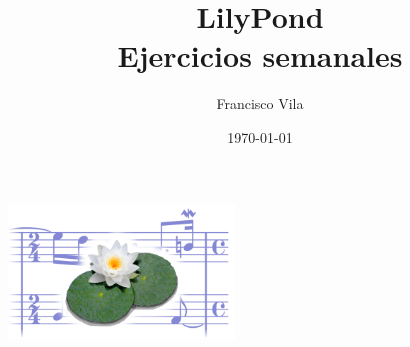 \documentclass[a4paper,10pt,oneside,headinclude,titlepage]{article} %
\title{LilyPond\\Ejercicios semanales}
\author{Francisco Vila}
\date{\today}
\begin{document}
\nonfrenchspacing

\begin{titlepage} %
  \makeatletter
  \begin{center}
    \vfill
    \includegraphics[width=60mm]{lily-logo.png}\par
    \vfill
    \textbf{\huge\@title}\par
    {\@date}
    \vfill
    \textbf{\large\@author}
    \vfill
  \end{center}
  \makeatother
\end{titlepage}


\begin{singlespace} %
  \tableofcontents
\end{singlespace}
 
 
 
 
 
 
 
 
 
 
 
 
 
 
 
 
 
 
 
 
 
 
 
\end{document}
